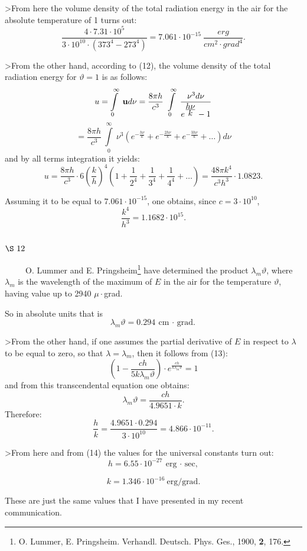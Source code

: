 \documentclass{article}
\begin{document}
>From here the volume density of the total radiation energy in the air 
for the absolute temperature of 1 turns out: 
$$
\frac{4 \cdot 7.31 \cdot 10^5}{3 \cdot 10^{10} \cdot (373^4 - 273^4)} =
7.061 \cdot 10^{-15} ~ \frac{erg}{cm^2 \cdot grad^4}.
$$

>From the other hand, according to (12), the volume density 
of the total radiation energy for $\vartheta = 1$ is as follows: 
$$
u = \int \limits^{\infty}_0~ {\cal \bf u} d \nu = \frac{8 \pi h}{c^3}~ \int
\limits^{\infty}_0~ \frac{\nu^3 d \nu}{e^{\frac{\displaystyle h \nu}
{\displaystyle k}} - 1} 
$$
$$
= \frac{8 \pi h}{c^3}~ \int \limits^{\infty}_0~
\nu^3 \left( e^{-\frac{\displaystyle h \nu}{\displaystyle k}} + 
e^{-\frac{\displaystyle 2 h \nu}{\displaystyle k}} + 
e^{-\frac{\displaystyle 3 h \nu}{\displaystyle k}} + \ldots \right) d\nu
$$
and by all terms integration it yields: 
$$
u = \frac{8 \pi h}{c^3} \cdot 6 \left( \frac{k}{h} \right)^4 \left( 1 + \frac{
1}{2^4} + \frac{1}{3^4} + \frac{1}{4^4} + \ldots \right) =
\frac{48 \pi k^4}{c^3 h^3} \cdot 1.0823.
$$

Assuming it to be equal to $7.061 \cdot 10^{-15}$, one obtains, 
since $c = 3 \cdot 10^{10}$,
\begin{equation}
\frac{k^4}{h^3} = 1.1682 \cdot 10^{15}.
\end{equation}

\vspace{0.5cm}
\subsection*{
{\bf $\S~12$}}
\vspace{0.3cm}

~~~~~O. Lummer and E. Pringsheim\footnote{O. Lummer, E. Pringsheim. 
Verhandl. Deutsch. Phys. Ges., 1900, {\bf 2}, 176.} have determined 
the product $\lambda_m \vartheta$, where $\lambda_m$ is the wavelength 
of the maximum of $E$ in the air for the temperature $\vartheta$, 
having value up to 2940 $\mu \cdot$grad.

So in absolute units that is 
$$
\lambda_m \vartheta = 0.294~ \mbox{cm $\cdot$ grad.}
$$

>From the other hand, if one assumes the partial derivative of $E$ 
in respect to $\lambda$ to be equal to zero, so that $\lambda = \lambda_m$, 
then it follows from (13): 
$$
\left( 1 - \frac{ch}{5k \lambda_m \vartheta} \right) \cdot e^{\frac
{\displaystyle ch}{\displaystyle k \lambda_m \vartheta}} = 1
$$
and from this transcendental equation one obtains: 
$$
\lambda_m \vartheta = \frac{ch}{4.9651 \cdot k}.
$$
Therefore: 
$$
\frac{h}{k} = \frac{4.9651 \cdot 0.294}{3 \cdot 10^{10}} = 4.866 \cdot 10^{-11}.
$$

>From here and from (14) the values for the universal constants turn out: 
\begin{equation}
h = 6.55 \cdot 10^{-27} ~ \mbox{erg $\cdot$ sec,}
\end{equation}

\begin{equation}
k = 1.346 \cdot 10^{-16} ~ \mbox{erg/grad.}
\end{equation}

These are just the same values 
that I have presented in my recent communication.
\end{document}
